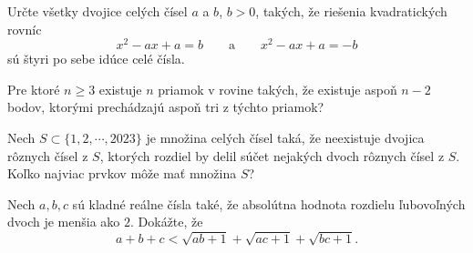 {%
Určte všetky dvojice celých čísel $a$ a $b$, $b > 0$, takých, že riešenia kvadratických rovníc
$$x^2 -ax + a = b \qquad \text{a} \qquad x^2 - ax + a = -b$$ sú štyri po sebe idúce celé čísla.}

{%
Pre ktoré $n \geq 3$ existuje $n$ priamok v rovine takých, že existuje aspoň $n-2$ bodov, ktorými prechádzajú aspoň tri z týchto priamok?}

{%
Nech $S\subset\{1,2,\cdots,2023\}$ je množina celých čísel taká, že neexistuje dvojica rôznych čísel z $S$, ktorých rozdiel by delil súčet nejakých dvoch rôznych čísel z $S$. Koľko najviac prvkov môže mať množina $S$?}

{%
Nech $ a,b,c$ sú kladné reálne čísla také, že absolútna hodnota rozdielu ľubovoľných dvoch je menšia ako $ 2$. Dokážte, že $$ a + b + c < \sqrt {ab + 1} + \sqrt {ac + 1} + \sqrt {bc + 1}.$$}
